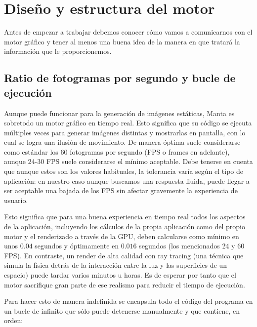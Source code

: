\section{Diseño y estructura del motor}

Antes de empezar a trabajar debemos conocer cómo vamos a comunicarnos con el motor gráfico y tener al menos una buena idea de la manera en que tratará la información que le proporcionemos.

\subsection{Ratio de fotogramas por segundo y bucle de ejecución}
\label{fps_bucle_ejecucion}
Aunque puede funcionar para la generación de imágenes estáticas, Manta es sobretodo un motor gráfico en tiempo real. Esto significa que su código se ejecuta múltiples veces para generar imágenes distintas y mostrarlas en pantalla, con lo cual se logra una ilusión de movimiento. De manera óptima suele considerarse como estándar los 60 fotogramas por segundo\cite{vsync_nvidia} (FPS o frames en adelante), aunque 24-30 FPS suele considerarse el mínimo aceptable. Debe tenerse en cuenta que aunque estos son los valores habituales, la tolerancia varía según el tipo de aplicación: en nuestro caso aunque buscamos una respuesta fluida, puede llegar a ser aceptable una bajada de los FPS sin afectar gravemente la experiencia de usuario.

Esto significa que para una buena experiencia en tiempo real todos los aspectos de la aplicación, incluyendo los cálculos de la propia aplicación como del propio motor y el renderizado a través de la GPU, deben calcularse como mínimo en unos $0.04$ segundos y óptimamente en $0.016$ segundos (los mencionados 24 y 60 FPS). En contraste, un render de alta calidad con ray tracing (una técnica que simula la física detrás de la interacción entre la luz y las superficies de un espacio) puede tardar varios minutos u horas\cite{nvidia_raytr}. Es de esperar por tanto que el motor sacrifique gran parte de ese realismo para reducir el tiempo de ejecución.

Para hacer esto de manera indefinida se encapsula todo el código del programa en un bucle de infinito que sólo puede detenerse manualmente y que contiene, en orden:

